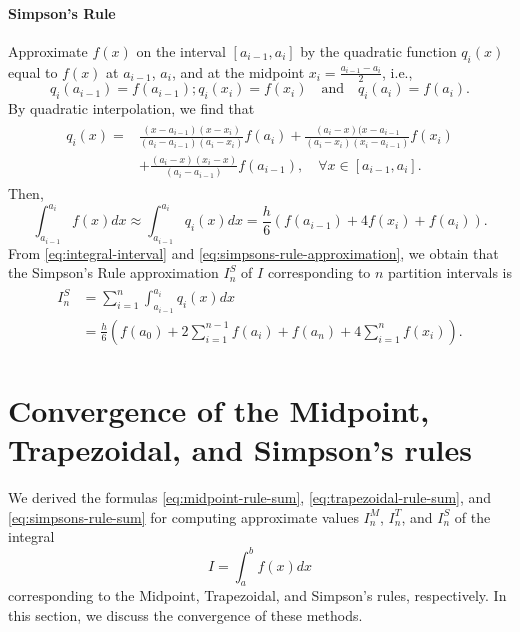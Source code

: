 \paragraph{Simpson's Rule}
Approximate $ f(x) $ on the interval $ [a_{i-1}, a_i] $ by the quadratic
    function $ q_i(x) $ equal to $ f(x) $ at $ a_{i-1} $, $ a_i $, and at the
    midpoint $ x_i = \frac{a_{i-1} - a_i}{2} $, i.e.,
\begin{equation*}
    q_i(a_{i-1}) = f(a_{i-1}); q_i(x_i) = f(x_i) \quad \text{and} \quad
        q_i(a_i) = f(a_i).
\end{equation*}
By quadratic interpolation, we find that
\begin{align}
    \begin{split}
        q_i(x)
            =& \frac{(x - a_{i-1})(x - x_i)}{(a_i - a_{i-1})(a_i - x_i)}
                f(a_i) + \frac{(a_i - x)(x - a_{i-1}}{(a_i - x_i)(x_i -
                a_{i-1})} f(x_i) \\
             &+ \frac{(a_i - x)(x_i - x)}{(a_i - a_{i-1})} f(a_{i-1}), \quad
                \forall x \in [a_{i-1}, a_i].
        \label{eq:simpsons-quadratic-function}
    \end{split}
\end{align}
Then,
\begin{equation}
    \int_{a_{i-1}}^{a_i} f(x) dx \approx \int_{a_{i-1}}^{a_i} q_i(x) dx =
        \frac{h}{6} (f(a_{i-1}) + 4 f(x_i) + f(a_i)).
    \label{eq:simpsons-rule-approximation}
\end{equation}
From \eqref{eq:integral-interval} and \eqref{eq:simpsons-rule-approximation},
    we obtain that the Simpson's Rule approximation $ I_n^S $ of $ I $
    corresponding to $ n $ partition intervals is
\begin{align}
    \begin{split}
        I_n^S
            &= \sum_{i=1}^{n} \int_{a_{i-1}}^{a_i} q_i(x) dx \\
            &= \frac{h}{6} \left( f(a_0) + 2 \sum_{i=1}^{n-1} f(a_i) + f(a_n) +
                4 \sum_{i=1}^{n} f(x_i) \right).
        \label{eq:simpsons-rule-sum}
    \end{split}
\end{align}

\section{Convergence of the Midpoint, Trapezoidal, and Simpson's rules}

We derived the formulas \eqref{eq:midpoint-rule-sum},
    \eqref{eq:trapezoidal-rule-sum}, and \eqref{eq:simpsons-rule-sum} for
    computing approximate values $ I_n^M $, $ I_n^T $, and $ I_n^S $ of the
    integral
\begin{equation*}
    I = \int_{a}^{b} f(x) dx
\end{equation*}
corresponding to the Midpoint, Trapezoidal, and Simpson's rules, respectively.
In this section, we discuss the convergence of these methods.

